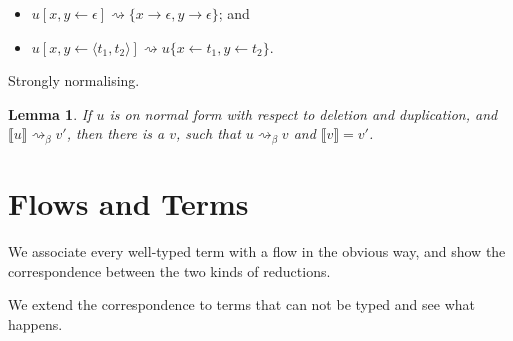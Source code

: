 \documentclass[11pt,a4paper]{article}
\theoremstyle{definition}
\theoremstyle{plain}
\newtheorem{lemma}[definition]{Lemma}
\theoremstyle{remark}
\begin{document}
\begin{itemize}
	\item $u[x,y\leftarrow\epsilon]\rightsquigarrow\{x\rightarrow\epsilon,y\rightarrow\epsilon\}$; and
	\item $u[x,y\leftarrow\langle t_1,t_2\rangle]\rightsquigarrow u\{x\leftarrow t_1,y\leftarrow t_2\}$.
\end{itemize}

Strongly normalising.

\begin{lemma}
	If $u$ is on normal form with respect to deletion and duplication, and $\llbracket u\rrbracket\rightsquigarrow_\beta v'$, then there is a $v$, such that $u\rightsquigarrow_\beta v$ and $\llbracket v\rrbracket=v'$.
\end{lemma}


\section{Flows and Terms}

We associate every well-typed term with a flow in the obvious way, and show the correspondence between the two kinds of reductions.

We extend the correspondence to terms that can not be typed and see what happens.
\end{document}
